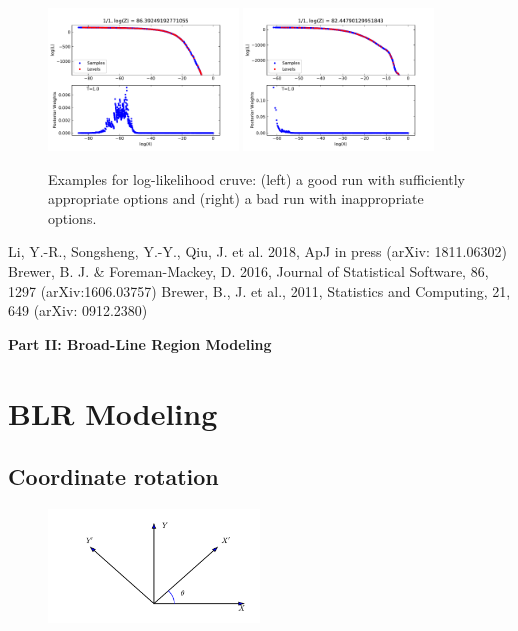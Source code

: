 \documentclass[oneside]{book}
\begin{document}
\begin{figure}[hp]
\centering 
\includegraphics[width=0.45\textwidth]{post1.pdf}
\includegraphics[width=0.45\textwidth]{post2.pdf}
\caption{Examples for log-likelihood cruve: (left) a good run with sufficiently appropriate options and (right) a bad 
run with inappropriate options.}
\end{figure}


\begin{thebibliography}{10}
  Li, Y.-R., Songsheng, Y.-Y., Qiu, J. et al. 2018, ApJ in press (arXiv: 1811.06302)
  Brewer, B. J. \& Foreman-Mackey, D. 2016, Journal of Statistical Software, 86, 1297 (arXiv:1606.03757)
  Brewer, B., J. et al., 2011, Statistics and Computing, 21, 649 (arXiv: 0912.2380)
\end{thebibliography}

\clearpage
\newpage

\vspace*{10cm}
{\Huge\centerline{\bf Part II: Broad-Line Region Modeling}}


\chapter{BLR Modeling}

\section{Coordinate rotation}
\begin{figure}[h!]
\centering
\includegraphics[width=0.5\textwidth]{coord.pdf}
\end{figure}
\end{document}
